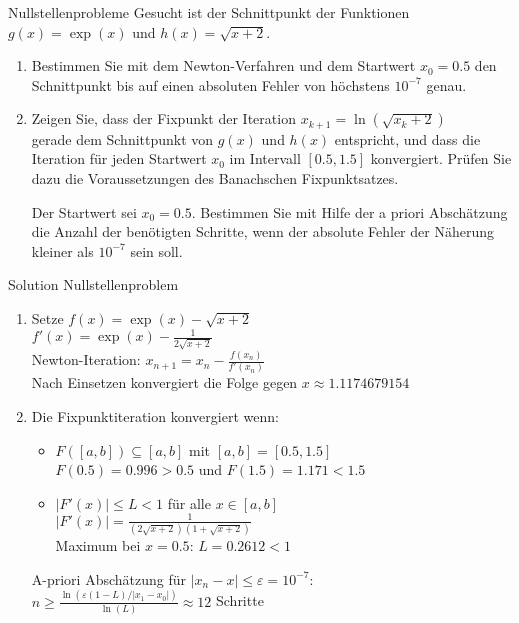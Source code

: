 \begin{example2}{Nullstellenprobleme}
Gesucht ist der Schnittpunkt der Funktionen $g(x) = \exp(x)$ und $h(x) = \sqrt{x+2}$.
\begin{enumerate}
    \item Bestimmen Sie mit dem Newton-Verfahren und dem Startwert $x_0 = 0.5$ den Schnittpunkt bis auf einen absoluten Fehler von höchstens $10^{-7}$ genau.
    
    \item Zeigen Sie, dass der Fixpunkt der Iteration
    $x_{k+1} = \ln(\sqrt{x_k + 2})$\\
    gerade dem Schnittpunkt von $g(x)$ und $h(x)$ entspricht, und dass die Iteration für jeden Startwert $x_0$ im Intervall $[0.5, 1.5]$ konvergiert. Prüfen Sie dazu die Voraussetzungen des Banachschen Fixpunktsatzes.
    
    Der Startwert sei $x_0 = 0.5$. Bestimmen Sie mit Hilfe der a priori Abschätzung die Anzahl der benötigten Schritte, wenn der absolute Fehler der Näherung kleiner als $10^{-7}$ sein soll.
\end{enumerate}
\end{example2}

\begin{KR}{Solution Nullstellenproblem}
\begin{enumerate}
    \item Setze $f(x) = \exp(x) - \sqrt{x+2}$\\
    $f'(x) = \exp(x) - \frac{1}{2\sqrt{x+2}}$\\
    Newton-Iteration: $x_{n+1} = x_n - \frac{f(x_n)}{f'(x_n)}$\\
    Nach Einsetzen konvergiert die Folge gegen $x \approx 1.1174679154$
    
    \item Die Fixpunktiteration konvergiert wenn:
    \begin{itemize}
        \item $F([a,b]) \subseteq [a,b]$ mit $[a,b] = [0.5, 1.5]$\\
        $F(0.5) = 0.996 > 0.5$ und $F(1.5) = 1.171 < 1.5$ \checkmark
        \item $|F'(x)| \leq L < 1$ für alle $x \in [a,b]$\\
        $|F'(x)| = \frac{1}{(2\sqrt{x+2})(1+\sqrt{x+2})}$\\
        Maximum bei $x=0.5$: $L=0.2612 < 1$ \checkmark
    \end{itemize}
    A-priori Abschätzung für $|x_n - x| \leq \varepsilon = 10^{-7}$:\\
    $n \geq \frac{\ln(\varepsilon(1-L)/|x_1-x_0|)}{\ln(L)} \approx 12$ Schritte
\end{enumerate}
\end{KR}

